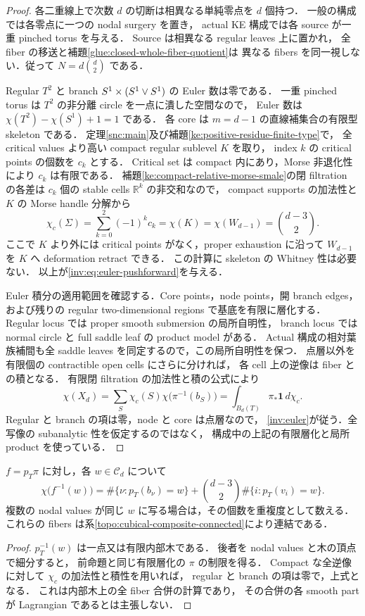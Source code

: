 \begin{proof}
各二重線上で次数 $d$ の切断は相異なる単純零点を $d$ 個持つ．
一般の構成では各零点に一つの nodal surgery を置き，
actual KE 構成では各 source が一重 pinched torus を与える．
Source は相異なる regular leaves 上に置かれ，
全 fiber の移送と補題\ref{glue:closed-whole-fiber-quotient}は
異なる fibers を同一視しない．従って $N=d\binom d2$ である．

Regular $T^2$ と branch $S^1\times(S^1\vee S^1)$ の Euler 数は零である．
一重 pinched torus は $T^2$ の非分離 circle を一点に潰した空間なので，
Euler 数は $\chi(T^2)-\chi(S^1)+1=1$ である．
各 core は $m=d-1$ の直線補集合の有限型 skeleton である．
定理\ref{snc:main}及び補題\ref{ke:positive-residue-finite-type}で，
全 critical values より高い compact regular sublevel $K$ を取り，
index $k$ の critical points の個数を $c_k$ とする．
Critical set は compact 内にあり，Morse 非退化性により $c_k$ は有限である．
補題\ref{ke:compact-relative-morse-smale}の閉 filtration の各差は
$c_k$ 個の stable cells $\mathbb R^k$ の非交和なので，
compact supports の加法性と $K$ の Morse handle 分解から
\[
 \chi_c(\Sigma)=\sum_{k=0}^2(-1)^k c_k
 =\chi(K)=\chi(W_{d-1})=\binom{d-3}{2}.
\]
ここで $K$ より外には critical points がなく，proper exhaustion に沿って
$W_{d-1}$ を $K$ へ deformation retract できる．
この計算に skeleton の Whitney 性は必要ない．
以上が\eqref{inv:eq:euler-pushforward}を与える．

Euler 積分の適用範囲を確認する．Core points，node points，開 branch edges，
および残りの regular two-dimensional regions で基底を有限に層化する．
Regular locus では proper smooth submersion の局所自明性，
branch locus では normal circle と full saddle leaf の product model がある．
Actual 構成の相対葉族補間も全 saddle leaves を同定するので，この局所自明性を保つ．
点層以外を有限個の contractible open cells にさらに分ければ，
各 cell 上の逆像は fiber との積となる．
有限閉 filtration の加法性と積の公式により
\[
 \chi(X_d)=\sum_{S}\chi_c(S)\chi\bigl(\pi^{-1}(b_S)\bigr)
          =\int_{B_d(T)}\pi_*\mathbf1\,d\chi_c .
\]
Regular と branch の項は零，node と core は点層なので，
\eqref{inv:euler}が従う．全写像の subanalytic 性を仮定するのではなく，
構成中の上記の有限層化と局所 product を使っている．
\end{proof}

\begin{corollary}
\label{inv:cubical-fiber-euler}
$f=p_T\pi$ に対し，各 $w\in\mathcal C_d$ について
\[
 \chi\bigl(f^{-1}(w)\bigr)
 =\#\{\nu:p_T(b_\nu)=w\}
  +\binom{d-3}{2}\#\{i:p_T(v_i)=w\}.
\]
複数の nodal values が同じ $w$ に写る場合は，その個数を重複度として数える．
これらの fibers は系\ref{topo:cubical-composite-connected}により連結である．
\end{corollary}
\begin{proof}
$p_T^{-1}(w)$ は一点又は有限内部木である．
後者を nodal values と木の頂点で細分すると，
前命題と同じ有限層化の $\pi$ の制限を得る．
Compact な全逆像に対して $\chi_c$ の加法性と積性を用いれば，
regular と branch の項は零で，上式となる．
これは内部木上の全 fiber 合併の計算であり，
その合併の各 smooth part が Lagrangian であるとは主張しない．
\end{proof}

